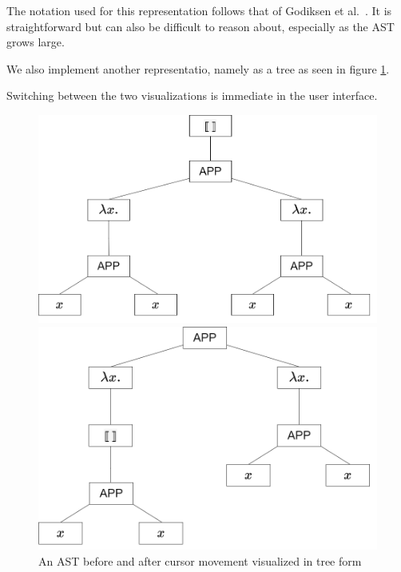 The notation used for this representation follows that of Godiksen
et al.~\pepm. It is straightforward but can also be
difficult to reason about, especially as the AST grows large.

We also implement another representatio, namely as a tree as seen in
figure \ref{fig:ast_visual_tree}.

Switching between the two visualizations is immediate in the user interface.

\begin{figure}
  \center
  \noindent\begin{minipage}{.45\textwidth}
    \center
    \includegraphics[width=\textwidth]{assets/ast_root_cursor.png}
  \end{minipage}\hfill
  \begin{minipage}{.45\textwidth}
    \center
    \includegraphics[width=\textwidth]{assets/ast_subtree_cursor.png}
  \end{minipage}\hfill
  \caption{An AST before and after cursor movement visualized in tree form}
  \label{fig:ast_visual_tree}
\end{figure}

